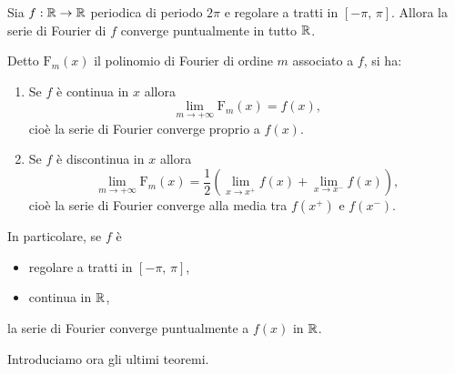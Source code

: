 \documentclass[../../analisi2]{subfiles}
\begin{document}
        \begin{teorema}
            Sia \(f : \mathbb{R} \to \mathbb{R}\) periodica di periodo \(2\pi\) e regolare a tratti in \([-\pi, \, \pi]\). Allora la serie di Fourier di
            \(f\) converge puntualmente in tutto \(\mathbb{R}\).

            Detto \(\mathrm{F}_m (x)\) il polinomio di Fourier di ordine \(m\) associato a \(f\), si ha:
            \begin{enumerate}
                \item Se \(f\) è continua in \(x\) allora
                    \[
                        \lim_{m \to +\infty} \mathrm{F}_m (x) = f(x),
                    \]
                    cioè la serie di Fourier converge proprio a \(f(x)\).
                \item Se \(f\) è discontinua in \(x\) allora
                    \[
                        \lim_{m \to +\infty} \mathrm{F}_m (x) = \frac{1}{2} \left(\lim_{x \to x^+} f(x) + \lim_{x \to x^-} f(x)\right),
                    \]
                    cioè la serie di Fourier converge alla media tra \(f(x^+)\) e \(f(x^-)\).
            \end{enumerate}
        \end{teorema}
        \begin{osservazione}
            In particolare, se \(f\) è
            \begin{itemize}
                \item regolare a tratti in \([-\pi, \, \pi]\),
                \item continua in \(\mathbb{R}\),
            \end{itemize}
            la serie di Fourier converge puntualmente a \(f(x)\) in \(\mathbb{R}\).
        \end{osservazione}

        Introduciamo ora gli ultimi teoremi.
\end{document}
